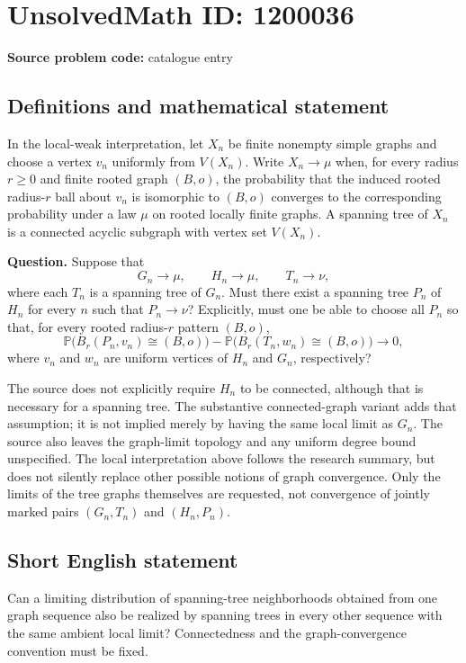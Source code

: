 \documentclass[11pt]{article}
\begin{document}
\section*{UnsolvedMath ID: 1200036}
\textbf{Source problem code:} catalogue entry
\subsection{Definitions and mathematical statement}
In the local-weak interpretation, let $X_n$ be finite nonempty simple graphs and choose a vertex $v_n$ uniformly from $V(X_n)$. Write $X_n\to\mu$ when, for every radius $r\geq0$ and finite rooted graph $(B,o)$, the probability that the induced rooted radius-$r$ ball about $v_n$ is isomorphic to $(B,o)$ converges to the corresponding probability under a law $\mu$ on rooted locally finite graphs. A spanning tree of $X_n$ is a connected acyclic subgraph with vertex set $V(X_n)$.

\textbf{Question.} Suppose that
\[
G_n\to\mu,\qquad H_n\to\mu,\qquad T_n\to\nu,
\]
where each $T_n$ is a spanning tree of $G_n$. Must there exist a spanning tree $P_n$ of $H_n$ for every $n$ such that $P_n\to\nu$? Explicitly, must one be able to choose all $P_n$ so that, for every rooted radius-$r$ pattern $(B,o)$,
\[
\mathbb P\big(B_r(P_n,v_n)\cong(B,o)\big)
-\mathbb P\big(B_r(T_n,w_n)\cong(B,o)\big)\longrightarrow0,
\]
where $v_n$ and $w_n$ are uniform vertices of $H_n$ and $G_n$, respectively?

The source does not explicitly require $H_n$ to be connected, although that is necessary for a spanning tree. The substantive connected-graph variant adds that assumption; it is not implied merely by having the same local limit as $G_n$. The source also leaves the graph-limit topology and any uniform degree bound unspecified. The local interpretation above follows the research summary, but does not silently replace other possible notions of graph convergence. Only the limits of the tree graphs themselves are requested, not convergence of jointly marked pairs $(G_n,T_n)$ and $(H_n,P_n)$.
\subsection{Short English statement}
Can a limiting distribution of spanning-tree neighborhoods obtained from one graph sequence also be realized by spanning trees in every other sequence with the same ambient local limit? Connectedness and the graph-convergence convention must be fixed.
\end{document}
